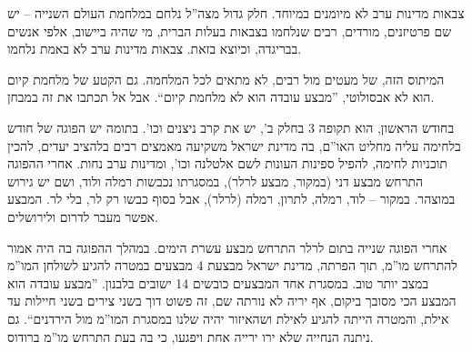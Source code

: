 \documentclass[]{../../../../tex/classes/styledArticle}
\begin{document}
	צבאות מדינות ערב לא מיומנים במיוחד. חלק גדול מצה''ל נלחם במלחמת העולם השנייה – יש שם פרטיזנים, מורדים, רבים שנלחמו בצבאות בעלות הברית, מי שהיה ביישוב, אלפי אנשים בבריגדה, וכיוצא בזאת. צבאות מדינות ערב לא באמת נלחמו. 
	
	המיתוס הזה, של מעטים מול רבים, לא מתאים לכל המלחמה. גם הקטע של מלחמת קיום הוא לא אבסולוטי, ''מבצע עובדה הוא לא מלחמת קיום``. אבל אל תכתבו את זה במבחן. 
	
	בחודש הראשון, הוא תקופה 3 בחלק ב', יש את קרב ניצנים וכו'. בתומה יש הפוגה של חודש בלחימה עליה מחליט האו''ם, בה מדינת ישראל משקיעה מאמצים רבים בלהציב יעדים, להכין תוכניות לחימה, להפיל ספינות העונות לשם אלטלנה וכו', ומדינות ערב נחות. אחרי ההפוגה התרחש מבצע דני (במקור, מבצע לרלר), במסגרתו נכבשות רמלה ולוד, ושם יש גירוש במוצהר. במקור – לוד, רמלה, לתרון, רמלה (לרלר), אבל בסוף כבשו רק לר, בלי לר. המבצע אפשר מעבר לדרום ולירושלים. 
	
	אחרי הפוגה שנייה בתום לרלר התרחש מבצע עשרת הימים. במהלך ההפוגה בה היה אמור להתרחש מו''מ, תוך הפרתה, מדינת ישראל מבצעת 4 מבצעים במטרה להגיע לשולחן המו''מ במצב יותר טוב. במסגרת אחד המבצעים כובשים 14 ישובים בלבנון. ''מבצע עובדה הוא המבצע הכי מסובך ביקום, אף יריה לא נורתה שם, זה פשוט דוך בשני צירים בשני חיילות עד אילת, והמטרה הייתה להגיע לאילת ושהאיזור יהיה שלנו במסגרת המו''מ מול הירדנים``. גם ניתנה הנחייה שלא ירו ירייה אחת ויפגעו, כי בה בעת התרחש מו''מ ברודוס. 
	
\end{document}
